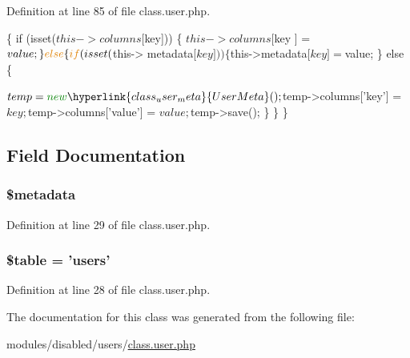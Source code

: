 Definition at line 85 of file class.\-user.\-php.


\begin{DoxyCode}
                                                                        \{
                                             \textcolor{keywordflow}{if} (isset($this->columns[$key])) \{
                                                            $this->columns[$key
      ] = $value;
                                             \} \textcolor{keywordflow}{else} \{
                                                            \textcolor{keywordflow}{if} (isset($this->
      metadata[$key])) \{
                                                                           
      $this->metadata[$key] = $value;
                                                            \} \textcolor{keywordflow}{else} \{
                                                                           
      $temp = \textcolor{keyword}{new} \hyperlink{class_user_meta}{UserMeta}();
                                                                           
      $temp->columns[\textcolor{stringliteral}{'key'}] = $key;
                                                                           
      $temp->columns[\textcolor{stringliteral}{'value'}] = $value;
                                                                           
      $temp->save();
                                                            \}
                                             \}
                              \}
\end{DoxyCode}


\subsection{Field Documentation}
\hypertarget{class_user_ae7fc3682b173ad9d4b1892bdc04d18d9}{
\subsubsection[{\$metadata}]{\setlength{\rightskip}{0pt plus 5cm}\$metadata}}\label{class_user_ae7fc3682b173ad9d4b1892bdc04d18d9}


Definition at line 29 of file class.\-user.\-php.

\hypertarget{class_user_ae8876a14058f368335baccf35af4a22b}{
\subsubsection[{\$table}]{\setlength{\rightskip}{0pt plus 5cm}\$table = 'users'}}\label{class_user_ae8876a14058f368335baccf35af4a22b}


Definition at line 28 of file class.\-user.\-php.



The documentation for this class was generated from the following file\-:\begin{DoxyCompactItemize}
\item 
modules/disabled/users/\hyperlink{class_8user_8php}{class.\-user.\-php}\end{DoxyCompactItemize}
